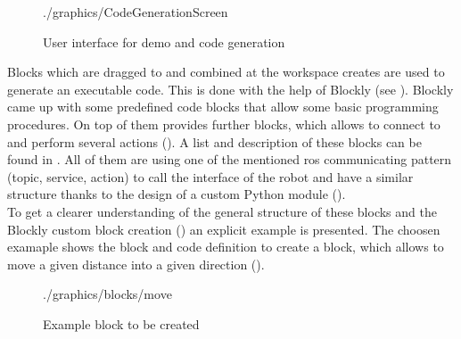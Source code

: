 \begin{figure}[htbp]
	\centering
	\begin{overpic}[width=\linewidth]{./graphics/CodeGenerationScreen}
	\end{overpic}
	\caption{User interface for demo and code generation}%
	\label{fig:CodeGeneration}%
\end{figure}

Blocks which are dragged to and combined at the workspace creates are used to generate an executable code. This is done with the help of Blockly (see ). Blockly came up with some predefined code blocks that allow some basic programming procedures.
On top of them \toolname{} provides further blocks, which allows to connect to \hobbit{} and perform several actions (). A list and description of these blocks can be found in . All of them are using one of the mentioned \gls{ros} communicating pattern (topic, service, action) to call the interface of the robot and have a similar structure thanks to the design of a custom Python module (). \\

To get a clearer understanding of the general structure of these blocks and the Blockly custom block creation () an explicit example is presented. The choosen examaple shows the block and code definition to create a block, which allows to move \hobbit{} a given distance into a given direction ().

\begin{figure}[htbp]
	\centering
	\begin{overpic}[width=0.3\linewidth]{./graphics/blocks/move}
	\end{overpic}
	\caption{Example block to be created}%
	\label{fig:ExBlockMove}%
\end{figure}

\begin{figure}[htbp]
	
\end{figure}

